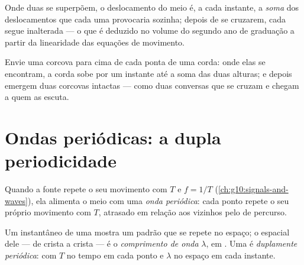 \begin{proposition}\label{prop:g12:mechanical-waves:superposition}
Onde duas  se superpõem, o deslocamento do meio é, a cada instante,
a \emph{soma} dos deslocamentos que cada uma provocaria sozinha; depois
de se cruzarem, cada  segue inalterada --- o que é deduzido no
volume do segundo ano de graduação a partir da linearidade das equações
de movimento. \admitted
\end{proposition}

\begin{example}\label{ex:g12:mechanical-waves:crossing}
Envie uma corcova para cima de cada ponta de uma corda: onde elas se
encontram, a corda sobe por um instante até a soma das duas alturas; e
depois emergem duas corcovas intactas --- como duas conversas que se
cruzam e chegam a quem as escuta.
\end{example}

\section{Ondas periódicas: a dupla periodicidade}

\begin{definition}\label{def:g12:mechanical-waves:periodic}
Quando a fonte repete o seu movimento com  $T$ e 
$f = 1/T$ (\cref{ch:g10:signals-and-waves}), ela alimenta o meio com uma
\emph{onda periódica}: cada ponto repete o seu
próprio movimento com  $T$, atrasado em relação aos vizinhos pelo
 de percurso.
\end{definition}

\begin{definition}\label{def:g12:mechanical-waves:wavelength}
Um instantâneo de uma  mostra um padrão que se repete no
espaço; o  espacial dele --- de crista a crista --- é o
\emph{comprimento de onda} $\lambda$, em
. Uma  é \emph{duplamente periódica}: com  $T$ no tempo em cada ponto e 
$\lambda$ no espaço em cada instante.
\end{definition}

